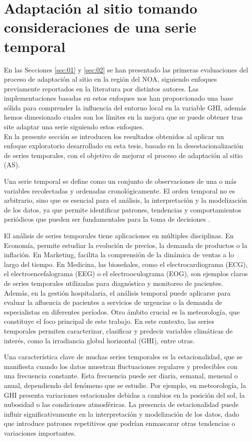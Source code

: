 \section{Adaptación al sitio tomando consideraciones de una serie temporal}
En las Secciones \ref{sec:01} y \ref{sec:02} se han presentado las primeras evaluaciones del proceso de adaptación al sitio en la región del NOA, siguiendo enfoques previamente reportados en la literatura por distintos autores. Las implementaciones basadas en estos enfoques nos han proporcionado una base sólida para comprender la influencia del entorno local en la variable GHI, además hemos dimesionado cuales son los límites en la mejora que se puede obtener tras site adaptar una serie siguiendo estos enfoques.\\

En la presente sección se introducen los resultados obtenidos al aplicar un enfoque exploratorio desarrollado en esta tesis, basado en la desestacionalización de series temporales, con el objetivo de mejorar el proceso de adaptación al sitio (AS).

Una serie temporal se define como un conjunto de observaciones de una o más variables recolectadas y ordenadas cronológicamente. El orden temporal no es arbitrario, sino que es esencial para el análisis, la interpretación y la modelización de los datos, ya que permite identificar patrones, tendencias y comportamientos periódicos que pueden ser fundamentales para la toma de decisiones \cite{Olivas2022}.

El análisis de series temporales tiene aplicaciones en múltiples disciplinas. En Economía, permite estudiar la evolución de precios, la demanda de productos o la inflación. En Marketing, facilita la comprensión de la dinámica de ventas a lo largo del tiempo. En Medicina, las bioseñales, como el electrocardiograma (ECG), el electroencefalograma (EEG) o el electrooculograma (EOG), son ejemplos claros de series temporales utilizadas para diagnóstico y monitoreo de pacientes. Además, en la gestión hospitalaria, el análisis temporal puede aplicarse para evaluar la afluencia de pacientes a servicios de urgencias o la demanda de especialistas en diferentes períodos. Otro ámbito crucial es la meteorología, que constituye el foco principal de este trabajo. En este contexto, las series temporales permiten caracterizar, clasificar y predecir variables climáticas de interés, como la irradiancia global horizontal (GHI), entre otras.

Una característica clave de muchas series temporales es la estacionalidad, que se manifiesta cuando los datos muestran fluctuaciones regulares y predecibles con una frecuencia constante. Esta frecuencia puede ser diaria, semanal, mensual o anual, dependiendo del fenómeno que se estudie. Por ejemplo, en meteorología, la GHI presenta variaciones estacionales debidas a cambios en la posición del sol, la nubosidad o las condiciones atmosféricas. La presencia de estacionalidad puede influir significativamente en la interpretación y modelización de los datos, dado que introduce patrones repetitivos que podrían enmascarar otras tendencias o variaciones importantes.

